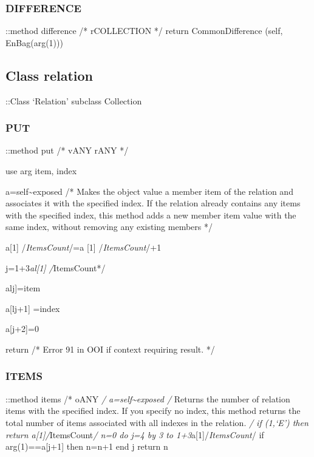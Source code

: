 \hypertarget{difference-1}{%
\subsubsection{DIFFERENCE}\label{difference-1}}

::method difference /* rCOLLECTION */ return CommonDifference (self,
EnBag(arg(1)))

\hypertarget{class-relation}{%
\subsection{Class relation}\label{class-relation}}

::Class `Relation' subclass Collection

\hypertarget{put-3}{%
\subsubsection{PUT}\label{put-3}}

::method put /* vANY rANY */

use arg item, index

a=self\textasciitilde exposed /* Makes the object value a member item of
the relation and associates it with the specified index. If the relation
already contains any items with the specified index, this method adds a
new member item value with the same index, without removing any existing
members */

a{[}1{]} /\emph{ItemsCount}/=a {[}1{]} /\emph{ItemsCount}/+1

j=1+3\emph{al{[}1{]} /}ItemsCount*/

alj{]}=item

a{[}lj+1{]} =index

a{[}j+2{]}=0

return /* Error 91 in OOI if context requiring result. */

\hypertarget{items-1}{%
\subsubsection{ITEMS}\label{items-1}}

::method items /* oANY \emph{/ a=self\textasciitilde exposed /} Returns
the number of relation items with the specified index. If you specify no
index, this method returns the total number of items associated with all
indexes in the relation. \emph{/ if \arg(1,`E') then return
a{[}1{]}/}ItemsCount\emph{/ n=0 do j=4 by 3 to
1+3}a{[}1{]}/\emph{ItemsCount}/ if arg(1)==a{[}j+1{]} then n=n+1 end j
return n

